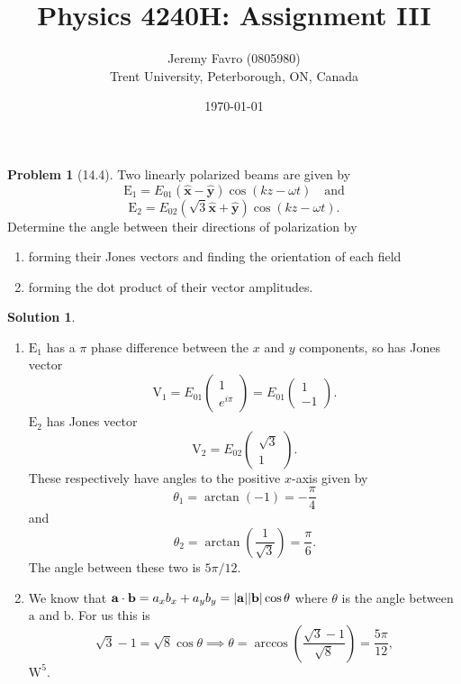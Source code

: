 \documentclass[10pt]{article}
\title{Physics 4240H: Assignment III}
\author{Jeremy Favro (0805980) \\ Trent University, Peterborough, ON, Canada}
\date{\today}
\theoremstyle{definition}
\newtheorem{problem}{Problem}
\newtheorem{soln}{Solution}
\newcommand{\ux}{\hat{\mathbf{x}}}
\newcommand{\uy}{\hat{\mathbf{y}}}
\newcommand{\bv}[1]{\bm{\mathrm{#1}}}
\begin{document}
\maketitle

\begin{problem}[14.4]
Two linearly polarized beams are given by
$$\bv{E}_1=E_{01}(\ux-\uy)\cos(kz-\omega t)\quad\text{and}$$
$$\bv{E}_2=E_{02}(\sqrt{3}\ux+\uy)\cos(kz-\omega t).$$
Determine the angle between their directions of polarization by
\begin{enumerate}[label=(\alph*)]
  \item forming their Jones vectors and finding the orientation of each field
  \item forming the dot product of their vector amplitudes.
\end{enumerate}
\end{problem}
\begin{soln}~
  \begin{enumerate}[label=(\alph*)]
    \item $\bv{E}_1$ has a $\pi$ phase difference between the $x$ and $y$ components, so has Jones vector
          $$\bv{V}_1=E_{01}\begin{pmatrix}
              1 \\e^{i\pi}
            \end{pmatrix}=E_{01}\begin{pmatrix}
              1 \\-1
            \end{pmatrix}.$$
          $\bv{E}_2$ has Jones vector
          $$\bv{V}_2=E_{02}\begin{pmatrix}
              \sqrt{3} \\1
            \end{pmatrix}.$$
          These respectively have angles to the positive $x$-axis given by
          $$\theta_1=\arctan(-1)=-\frac{\pi}{4}$$
          and
          $$\theta_2=\arctan(\frac{1}{\sqrt{3}})=\frac{\pi}{6}.$$
          The angle between these two is $5\pi/12$.
    \item We know that $\bv{a}\cdot\bv{b}=a_xb_x+a_yb_y=\abs{\bv{a}}\abs{\bv{b}}\cos\theta$ where $\theta$ is the angle between $\bv{a}$ and $\bv{b}$.
          For us this is
          $$\sqrt{3}-1=\sqrt{8}\cos\theta\implies \theta=\arccos\left(\frac{\sqrt{3}-1}{\sqrt{8}}\right)=\frac{5\pi}{12},$$
          $\text{W}^5$.
  \end{enumerate}
\end{soln}
\newpage
\end{document}
